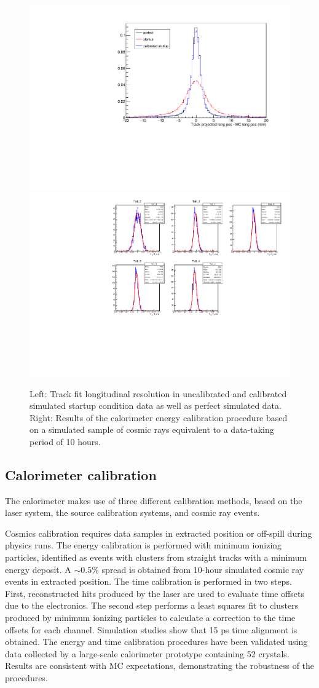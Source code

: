 \begin{figure}[tbp]
  \centering
  \includegraphics[height=0.4\textwidth]{figures/calibratedlong.pdf}%
  \includegraphics[height=0.4\textwidth]{figures/caloCalibTime.pdf}
  \caption{Left: Track fit longitudinal resolution in uncalibrated and calibrated simulated startup condition data as well as perfect simulated data. Right: Results of the calorimeter energy calibration procedure based on a simulated sample of cosmic rays equivalent to a data-taking period of 10 hours.}
  \label{fig:calibLong}
\end{figure}


\subsection{Calorimeter calibration}

The calorimeter makes use of three different calibration methods, based on the laser system, the source calibration systems, and cosmic ray events.

Cosmics calibration requires data samples in extracted position or off-spill during physics runs. The energy calibration is performed with minimum ionizing particles, identified as events with clusters from straight tracks with a minimum energy deposit. A $\sim 0.5\%$ spread is obtained from 10-hour simulated cosmic ray events in extracted position. The time calibration is performed in two steps. First, reconstructed hits produced by the laser are used to evaluate time offsets due to the electronics. The second step performs a least squares fit to clusters produced by minimum ionizing particles to calculate a correction to the time offsets for each channel. Simulation studies show that 15 ps time alignment is obtained. The energy and time calibration procedures have been validated using data collected by a large-scale calorimeter prototype containing 52 crystals. Results are consistent with MC expectations, demonstrating the robustness of the procedures.

